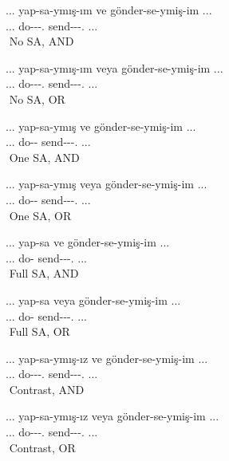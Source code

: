 \begin{exe}
\ex \label{selfpacedexamples}
    \begin{xlist}
     \ex \gll ... yap-sa-ymış-ım ve gönder-se-ymiş-im ... \\ ... do-{\Cond}-{\Prf}-{\First}.{\Sg} {\And} send-{\Cond}-{\Prf}-{\First}.{\Sg} ... \\
     \glt ${}$ \hfill No SA, AND
     
     \ex \gll ... yap-sa-ymış-ım veya gönder-se-ymiş-im ... \\ ... do-{\Cond}-{\Prf}-{\First}.{\Sg} {\And} send-{\Cond}-{\Prf}-{\First}.{\Sg} ... \\
     \glt ${}$ \hfill No SA, OR
     
     \ex \gll ... yap-sa-ymış ve gönder-se-ymiş-im ... \\ ... do-{\Cond}-{\Prf} {\And} send-{\Cond}-{\Prf}-{\First}.{\Sg} ... \\
     \glt ${}$ \hfill One SA, AND
     
     \ex \gll ... yap-sa-ymış veya gönder-se-ymiş-im ... \\ ... do-{\Cond}-{\Prf} {\And} send-{\Cond}-{\Prf}-{\First}.{\Sg} ... \\
     \glt ${}$ \hfill One SA, OR
     
     \ex \gll ... yap-sa ve gönder-se-ymiş-im ... \\ ... do-{\Cond} {\And} send-{\Cond}-{\Prf}-{\First}.{\Sg} ... \\
     \glt ${}$ \hfill Full SA, AND
     
     \ex \gll ... yap-sa veya gönder-se-ymiş-im ... \\ ... do-{\Cond} {\And} send-{\Cond}-{\Prf}-{\First}.{\Sg} ... \\
     \glt ${}$ \hfill Full SA, OR
     
     \ex \gll ... yap-sa-ymış-ız ve gönder-se-ymiş-im ... \\ ... do-{\Cond}-{\Prf}-{\First}.{\Pl} {\And} send-{\Cond}-{\Prf}-{\First}.{\Sg} ... \\
     \glt ${}$ \hfill Contrast, AND
     
     \ex \gll ... yap-sa-ymış-ız veya gönder-se-ymiş-im ... \\ ... do-{\Cond}-{\Prf}-{\First}.{\Pl} {\And} send-{\Cond}-{\Prf}-{\First}.{\Sg} ... \\
     \glt ${}$ \hfill Contrast, OR
    \end{xlist}
\end{exe}

